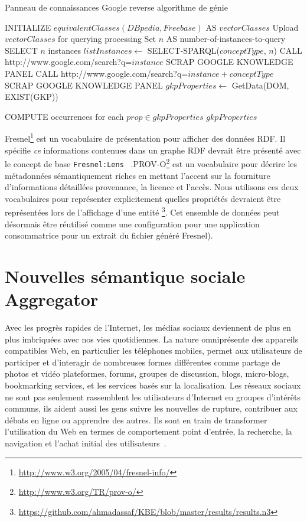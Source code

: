 \documentclass[a4paper,11pt,twoside]{ThesisStyle}
\begin{document}
\begin{algorithm}[ht]
\caption{Panneau de connaissances Google reverse algorithme de génie} \label{algoscrapping}
\begin{algorithmic}[1]
\small
    \STATE INITIALIZE $equivalentClasses(DBpedia,Freebase) $ AS $vectorClasses$
    \STATE Upload $vectorClasses$ for querying processing
    \STATE Set $n$ AS number-of-instances-to-query
	\STATE SELECT $n$ instances
	\STATE $listInstances \leftarrow$ SELECT-SPARQL($conceptType$, $n$)
			\STATE CALL http://www.google.com/search?q=$instance$
				\STATE SCRAP GOOGLE KNOWLEDGE PANEL
			\ELSE
				\STATE CALL http://www.google.com/search?q=$instance + conceptType$
 				\STATE SCRAP GOOGLE KNOWLEDGE PANEL
			\ENDIF
			\STATE $gkpProperties \leftarrow$ GetData(DOM, EXIST(GKP))

		\ENDFOR
	\STATE COMPUTE occurrences for each $prop \in gkpProperties$
    \ENDFOR
    \STATE $gkpProperties$
\end{algorithmic}
\end{algorithm}


Fresnel\footnote{\url{http://www.w3.org/2005/04/fresnel-info/}} est un vocabulaire de présentation pour afficher des données RDF. Il spécifie \textit{ce} informations contenues dans un graphe RDF devrait être présenté avec le concept de base \texttt{Fresnel:Lens}~\cite{Pietriga: ISWC: 06} .PROV-O\footnote{\url{http://www.w3.org/TR/prov-o/}} est un vocabulaire pour décrire les métadonnées sémantiquement riches en mettant l'accent sur la fourniture d'informations détaillées provenance, la licence et l'accès. Nous utilisons ces deux vocabulaires pour représenter explicitement quelles propriétés devraient être représentées lors de l'affichage d'une entité \footnote{\url{https://github.com/ahmadassaf/KBE/blob/master/results/results.n3}}. Cet ensemble de données peut désormais être réutilisé comme une configuration pour une application consommatrice pour un extrait du fichier généré Fresnel).


\section{Nouvelles sémantique sociale Aggregator}\label{chapter:snarc}

Avec les progrès rapides de l'Internet, les médias sociaux deviennent de plus en plus imbriquées avec nos vies quotidiennes. La nature omniprésente des appareils compatibles Web, en particulier les téléphones mobiles, permet aux utilisateurs de participer et d'interagir de nombreuses formes différentes comme partage de photos et vidéo plateformes, forums, groupes de discussion, blogs, micro-blogs, bookmarking services, et les services basés sur la localisation. Les réseaux sociaux ne sont pas seulement rassemblent les utilisateurs d'Internet en groupes d'intérêts communs, ils aident aussi les gens suivre les nouvelles de rupture, contribuer aux débats en ligne ou apprendre des autres. Ils sont en train de transformer l'utilisation du Web en termes de comportement point d'entrée, la recherche, la navigation et l'achat initial des utilisateurs~\cite{Bakshy:WWW:12}.
\end{document}
